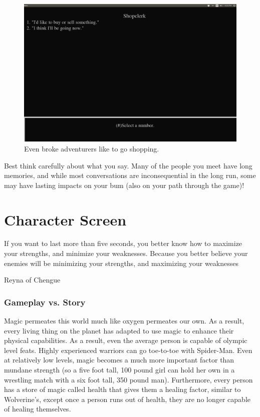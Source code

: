 \documentclass{report}
\begin{document}
\begin{itemize}
   \begin{figure}[h!]
        \includegraphics[width=\textwidth]{talking}
        \caption{Even broke adventurers like to go shopping.}
        \label{fig_shopping}
    \end{figure}
    
    Best think carefully about what you say.
    Many of the people you meet have long memories, and while most conversations are inconsequential in the long run, some may have lasting impacts on your bum (also 
    on your path through the game)!

\chapter{Character Screen}
\label{ch_chararacter_screen}
\epigraph{If you want to last
more than five seconds, you better know how to maximize your strengths, and 
minimize your weaknesses. Because you better believe your enemies will be 
minimizing your strengths, and maximizing your weaknesses}{Reyna of Chengue}

\subsection{Gameplay vs. Story}
Magic permeates this world much like oxygen permeates our own. As a result, every living thing on the planet has adapted to use magic to enhance their physical capabilities. As a result, even the 
average person is capable of olympic level feats. Highly experienced warriors can go toe-to-toe with Spider-Man. Even at relatively low levels, magic becomes a much more important factor
than mundane strength (so a five foot tall, 100 pound girl can hold her own in a wrestling match with a six foot tall, 350 pound man). Furthermore, every person has a store of magic called health that 
gives them a healing factor, similar to Wolverine's, except once a person runs out of health, they are no longer capable of healing themselves.


\end{itemize}
\end{document}
